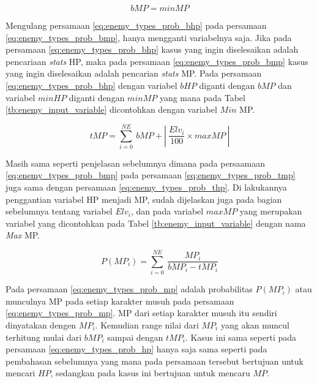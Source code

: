 \begin{equation}\label{eq:enemy_types_prob_bmp}
bMP = minMP
\end{equation}

Mengulang persamaan \ref{eq:enemy_types_prob_bhp} pada persamaan \ref{eq:enemy_types_prob_bmp}, hanya mengganti variabelnya saja. Jika pada persamaan \ref{eq:enemy_types_prob_bhp} kasus yang ingin diselesaikan adalah pencariaan \textit{stats} HP, maka pada persamaan \ref{eq:enemy_types_prob_bmp} kasus yang ingin diselesaikan adalah pencarian \textit{stats} MP. Pada persamaan \ref{eq:enemy_types_prob_bhp} dengan variabel $bHP$ diganti dengan $bMP$ dan variabel $minHP$ diganti dengan $minMP$ yang mana pada Tabel \ref{tb:enemy_input_variable} dicontohkan dengan variabel $Min$ MP.
\vspace{2ex}

\begin{equation}\label{eq:enemy_types_prob_tmp}
tMP = \sum_{i=0}^{NE}\ bMP + \left |\ \frac{Elv_{i}}{100} \times maxMP\ \right |
\end{equation}

Masih sama seperti penjelasan sebelumnya dimana pada persaamaan \ref{eq:enemy_types_prob_bmp} pada persamaan \ref{eq:enemy_types_prob_tmp} juga sama dengan persamaan \ref{eq:enemy_types_prob_thp}. Di lakukannya penggantian variabel HP menjadi MP, sudah dijelaskan juga pada bagian sebelumnya tentang variabel $Elv_{i}$, dan pada variabel $maxMP$ yang merupakan variabel yang dicontohkan pada Tabel \ref{tb:enemy_input_variable} dengan nama \textit{Max} MP.
\vspace{2ex}

\begin{equation}\label{eq:enemy_types_prob_mp}
P(MP_{i}) = \sum_{i=0}^{NE}\ \frac{MP_{i}}{bMP_{i} - tMP_{i}}
\end{equation}

Pada persamaan \ref{eq:enemy_types_prob_mp} adalah probabilitas $P(MP_{i})$ atau munculnya MP pada setiap karakter musuh pada persamaan \ref{eq:enemy_types_prob_mp}. MP dari setiap karakter musuh itu sendiri dinyatakan dengen $MP_{i}$. Kemudian range nilai dari $MP_{i}$ yang akan muncul terhitung mulai dari $bMP_{i}$ sampai dengan $tMP_{i}$. Kasus ini sama seperti pada persamaan \ref{eq:enemy_types_prob_hp} hanya saja sama seperti pada pembahasan sebelumnya yang mana pada persamaan tersebut bertujuan untuk mencari $HP$, sedangkan pada kasus ini bertujuan untuk mencaru $MP$.
\vspace{1ex}

